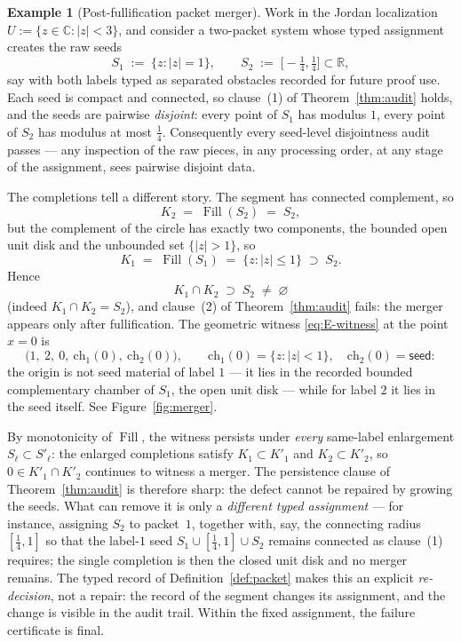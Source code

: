 \documentclass[11pt,reqno]{amsart}
\theoremstyle{definition}
\newtheorem{example}[theorem]{Example}
\theoremstyle{remark}
\newcommand{\C}{\mathbb C}
\newcommand{\Fill}{\operatorname{Fill}}
\begin{document}
\begin{example}[Post-fullification packet merger]\label{ex:merger}
Work in the Jordan localization $U:=\{z\in\C:|z|<3\}$, and consider a two-packet
system whose typed assignment creates the raw seeds
\[
S_1\;:=\;\{z:|z|=1\},
\qquad
S_2\;:=\;\bigl[-\tfrac14,\tfrac14\bigr]\subset\mathbb R,
\]
say with both labels typed as separated obstacles recorded for future proof use.
Each seed is compact and connected, so clause~(1) of Theorem~\ref{thm:audit} holds,
and the seeds are pairwise \emph{disjoint}: every point of $S_1$ has modulus $1$,
every point of $S_2$ has modulus at most $\tfrac14$. Consequently every seed-level
disjointness audit passes --- any inspection of the raw pieces, in any processing
order, at any stage of the assignment, sees pairwise disjoint data.

The completions tell a different story. The segment has connected complement, so
\[
K_2\;=\;\Fill(S_2)\;=\;S_2 ,
\]
but the complement of the circle has exactly two components, the bounded open unit
disk and the unbounded set $\{|z|>1\}$, so
\[
K_1\;=\;\Fill(S_1)\;=\;\{z:|z|\le1\}\;\supset\;S_2 .
\]
Hence
\[
K_1\cap K_2\;\supset\;S_2\;\neq\;\varnothing
\]
(indeed $K_1\cap K_2=S_2$), and clause~(2) of Theorem~\ref{thm:audit} fails: the
merger appears only after fullification. The geometric witness \eqref{eq:E-witness}
at the point $x=0$ is
\[
\bigl(1,\ 2,\ 0,\ \mathrm{ch}_1(0),\ \mathrm{ch}_2(0)\bigr),
\qquad
\mathrm{ch}_1(0)=\{z:|z|<1\},
\quad
\mathrm{ch}_2(0)=\textsf{seed}:
\]
the origin is not seed material of label $1$ --- it lies in the recorded bounded
complementary chamber of $S_1$, the open unit disk --- while for label $2$ it lies in
the seed itself. See Figure~\ref{fig:merger}.

By monotonicity of $\Fill$, the witness persists under \emph{every} same-label
enlargement $S_\ell\subset S'_\ell$: the enlarged completions satisfy
$K_1\subset K'_1$ and $K_2\subset K'_2$, so $0\in K'_1\cap K'_2$ continues to
witness a merger. The persistence clause of Theorem~\ref{thm:audit} is therefore
sharp: the defect cannot be repaired by growing the seeds. What can remove it is
only a \emph{different typed assignment} --- for instance, assigning $S_2$ to
packet~$1$, together with, say, the connecting radius $[\tfrac14,1]$ so that the
label-$1$ seed $S_1\cup[\tfrac14,1]\cup S_2$ remains connected as clause~(1)
requires; the single completion is then the closed unit disk and no merger remains.
The typed record of Definition~\ref{def:packet} makes this an explicit
\emph{re-decision}, not a repair: the record of the segment changes its assignment,
and the change is visible in the audit trail. Within the fixed assignment, the
failure certificate is final.


\end{example}
\end{document}
